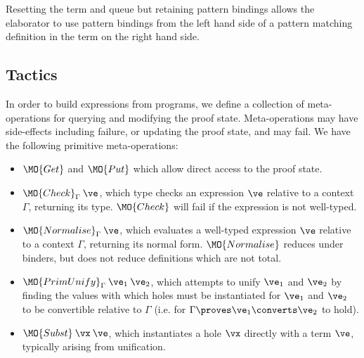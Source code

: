 \DM{
(\vC, \Delta, \hole{\vx}{\vt}\SC\vx, \langle\rangle, \langle\vx\rangle)
}

Resetting the term and queue but retaining pattern bindings
allows the elaborator to use pattern bindings from the left
hand side of a pattern matching definition in the term on the right hand side.


\newcommand{\Check}{\MO{Check}_\Gamma}
\newcommand{\Eval}{\MO{Normalise}_\Gamma}
\newcommand{\Unify}{\MO{Unify}_\Gamma}
\newcommand{\PrimUnify}{\MO{PrimUnify}_\Gamma}
\newcommand{\Subst}{\MO{Subst}}

\subsection{Tactics}

In order to build \TT{} expressions from \Idris{} programs, we define a collection
of meta-operations for querying and modifying the proof state. Meta-operations
may have side-effects including failure, or updating the proof state, and
may fail. We have the following primitive meta-operations:

\begin{itemize}
\item $\MO{Get}$ and $\MO{Put}$ which allow direct access to the proof state.
\item $\Check\:\ve$, which type checks an expression $\ve$ relative to a context
$\Gamma$, returning its type.
$\MO{Check}$ will fail
if the expression is not well-typed.
\item $\Eval\:\ve$, which evaluates a well-typed expression $\ve$ relative to a context 
$\Gamma$, returning its normal form. $\MO{Normalise}$ reduces under binders,
but does not reduce definitions which are not total.
\item 
$\PrimUnify\:\ve_1\:\ve_2$, 
which attempts to unify $\ve_1$ and $\ve_2$ by finding the values with which
holes must be instantiated for $\ve_1$ and $\ve_2$ to be convertible relative
to $\Gamma$ (i.e. for $\Gamma\proves\ve_1\converts\ve_2$ to hold).
\item $\Subst\:\vx\:\ve$, which instantiates a hole $\vx$ directly with a term
$\ve$, typically arising from unification.
\end{itemize}

